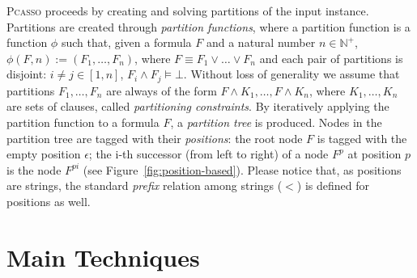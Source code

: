 \documentclass[conference]{IEEEtran}
\newcommand{\1}{x_1}
\newcommand{\2}{x_2}
\newcommand{\3}{x_3}
\newcommand{\4}{x_4}
\newcommand{\5}{x_5}
\newcommand{\6}{x_6}
\newcommand{\7}{x_7}
\newcommand{\8}{x_8}
\newcommand{\9}{x_9}
\newcommand{\pcasso}{\textsc{Pcasso}\xspace}
\begin{document}
\pcasso proceeds by creating and solving partitions of the input instance.
Partitions are created through \emph{partition functions}, where a partition function is a function $\phi$ such that, given a  formula $F$ and a natural number $n \in \mathbb{N^+}$, ${\phi(F,n) := (F_1, \ldots, F_n)}$, where ${F \equiv F_1 \lor \ldots \lor F_n}$ and each pair of partitions is disjoint: ${i \neq j \in [1,n]}$, ${F_i \land F_j \models \bot}$. 
Without loss of generality we assume that partitions $F_1, \ldots, F_n$ are always of the form ${F \land K_1, \ldots, F \land K_n}$, where $K_1, \ldots, K_n$ are sets of clauses, called \emph{partitioning constraints}.
By iteratively applying the partition function to a formula $F$, a \emph{partition tree} 
is produced. 
Nodes in the partition tree are tagged with their \emph{positions}: the root node $F$ is tagged with the empty position $\epsilon$; the i-th successor (from left to right) of a node $F^p$ at position $p$ is the node $F^{pi}$ (see Figure~\ref{fig:position-based}).
Please notice that, as positions are strings, the standard \emph{prefix} relation among strings ($<$) is defined for positions as well.

% 
% 
% 
% 

\section{Main Techniques}

% 
\end{document}
